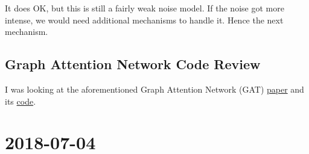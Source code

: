 \documentclass[a4paper]{article}
\newcommand{\DatestampYMD}[3]{\mbox{#1-#2-#3}}
\newcommand{\entry}[3]{\newpage\section*{\DatestampYMD{#1}{#2}{#3}} }
\begin{document}
\begin{figure}[H]
\begin{minipage}{.45\linewidth}
{            \label{fig:pairwise5inf_sub2}
        }
    \end{minipage}
    \begin{minipage}{.9\linewidth}
        \centering
    \end{minipage}
    \centering
    \label{fig:pairwise3inf_large_plot}
\end{figure}
It does OK, but this is still a fairly weak noise model. If the noise got more intense, we would need additional mechanisms to handle it. Hence the next mechanism.
\subsection*{Graph Attention Network Code Review}
I was looking at the aforementioned Graph Attention Network (GAT) \href{https://arxiv.org/pdf/1710.10903.pdf}{paper} and its \href{https://github.com/PetarV-/GAT}{code}.

\entry{2018}{07}{04}
\end{document}
